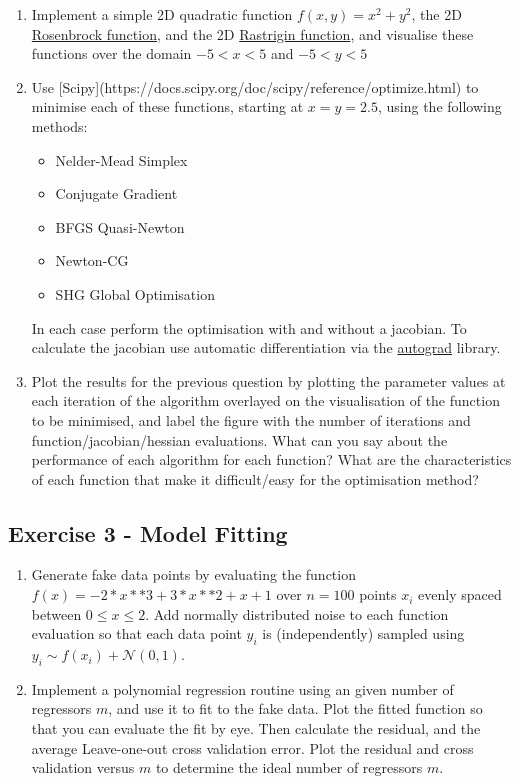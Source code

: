 \documentclass[a4paper]{article}
\begin{document}
\begin{enumerate}[label=\Alph*]
  \item Implement a simple 2D quadratic function $f(x, y) = x^2 + y^2$, the 2D \href{https://en.wikipedia.org/wiki/Rosenbrock_function}{Rosenbrock
function}, and the 2D \href{https://en.wikipedia.org/wiki/Rastrigin_function}{Rastrigin
    function}, and visualise these
    functions over the domain $-5 < x < 5$ and $-5 < y < 5$
  \item Use [Scipy](https://docs.scipy.org/doc/scipy/reference/optimize.html) to
    minimise each of these functions, starting at $x = y = 2.5$, using the following methods:
        \begin{itemize}
        \item Nelder-Mead Simplex
        \item Conjugate Gradient
        \item BFGS Quasi-Newton
        \item Newton-CG
        \item SHG Global Optimisation
        \end{itemize}
        In each case perform the optimisation with and without a jacobian. To calculate
        the jacobian use automatic differentiation via the \href{https://github.com/HIPS/autograd}{autograd} library.
        
    \item Plot the results for the previous question by plotting the parameter values at
      each iteration of the algorithm overlayed on the visualisation of the function to
      be minimised, and label the figure with the number of iterations and function/jacobian/hessian
      evaluations. What can you say about the performance of each algorithm for each
      function? What are the characteristics of each function that make it
      difficult/easy for the optimisation method?
\end{enumerate}
      

\subsection*{Exercise 3 - Model Fitting}

\begin{enumerate}[label=\Alph*]
  \item Generate fake data points by evaluating the function $f(x) = -2*x**3 +
    3*x**2 + x + 1$ over $n=100$ points $x_i$ evenly spaced between $0 \le x \le 2$. Add
    normally distributed noise to each function evaluation so that each data point $y_i$
    is (independently) sampled using $y_i \sim f(x_i) + \mathcal{N}(0, 1)$.

  \item Implement a polynomial regression routine using an given number of regressors
    $m$, and use it to fit to the fake data. Plot the fitted function so that you can
    evaluate the fit by eye. Then calculate the residual, and the average
    Leave-one-out cross validation error. Plot the residual and cross validation versus
    $m$ to determine the ideal number of regressors $m$.

\end{enumerate}
    
\end{document}
